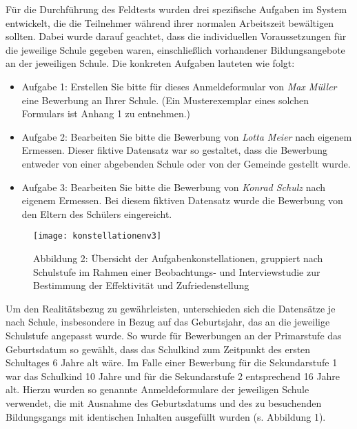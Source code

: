 Für die Durchführung des Feldtests wurden drei spezifische Aufgaben im System entwickelt, die die Teilnehmer während ihrer normalen Arbeitszeit bewältigen sollten. Dabei wurde darauf geachtet, dass die individuellen  Voraussetzungen für die jeweilige Schule gegeben waren, einschließlich  vorhandener Bildungsangebote an der jeweiligen Schule. Die konkreten Aufgaben lauteten wie folgt:

\begin{itemize}
\item Aufgabe 1: \glqq Erstellen Sie bitte für dieses Anmeldeformular von \textit{Max Müller} eine Bewerbung an Ihrer Schule.\grqq{} (Ein Musterexemplar eines solchen Formulars ist Anhang 1 zu entnehmen.)
\item Aufgabe 2: \glqq Bearbeiten Sie bitte die Bewerbung von \textit{Lotta Meier} nach eigenem Ermessen.\grqq{}  Dieser fiktive Datensatz war so gestaltet, dass die Bewerbung entweder von einer abgebenden Schule oder von der Gemeinde gestellt wurde.
\item Aufgabe 3: \glqq Bearbeiten Sie bitte die Bewerbung von \textit{Konrad Schulz} nach eigenem Ermessen.\grqq{}  Bei diesem fiktiven Datensatz wurde die Bewerbung von den Eltern des Schülers eingereicht.
\end{itemize}

\begin{figure}[H]
    \caption{Abbildung 2: Übersicht der Aufgabenkonstellationen, gruppiert nach Schulstufe im Rahmen einer Beobachtungs- und Interviewstudie zur Bestimmung der Effektivität und Zufriedenstellung}
    \texttt{[image: konstellationenv3]}
\end{figure}


Um den Realitätsbezug zu gewährleisten, unterschieden sich die Datensätze je nach Schule, insbesondere in Bezug auf das Geburtsjahr, das an die jeweilige Schulstufe angepasst wurde. So wurde für Bewerbungen an der Primarstufe das Geburtsdatum so gewählt, dass das Schulkind zum Zeitpunkt des ersten Schultages 6 Jahre alt wäre. Im Falle einer Bewerbung für die Sekundarstufe 1 war das Schulkind 10 Jahre und für die Sekundarstufe 2 entsprechend 16 Jahre alt.
Hierzu wurden so genannte Anmeldeformulare der jeweiligen Schule verwendet, die mit Ausnahme des Geburtsdatums und des zu besuchenden Bildungsgangs mit identischen Inhalten ausgefüllt wurden (s. Abbildung 1).

